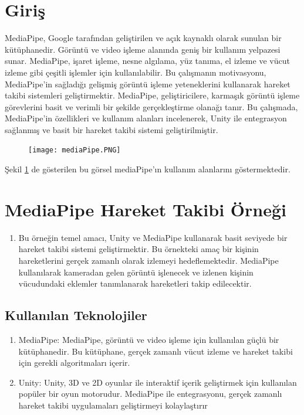 \documentclass[12pt, a4paper]{article}
\begin{document}
	\section{Giriş}
	MediaPipe, Google tarafından geliştirilen ve açık kaynaklı olarak sunulan bir kütüphanedir. Görüntü ve video işleme alanında geniş bir kullanım yelpazesi sunar. MediaPipe, işaret işleme, nesne algılama, yüz tanıma, el izleme ve vücut izleme gibi çeşitli işlemler için kullanılabilir. Bu çalışmanın motivasyonu, MediaPipe'in sağladığı gelişmiş görüntü işleme yeteneklerini kullanarak hareket takibi sistemleri geliştirmektir. MediaPipe, geliştiricilere, karmaşık görüntü işleme görevlerini basit ve verimli bir şekilde gerçekleştirme olanağı tanır. Bu çalışmada, MediaPipe'in özellikleri ve kullanım alanları incelenerek, Unity ile entegrasyon sağlanmış ve basit bir hareket takibi sistemi geliştirilmiştir.
	
	\begin{figure}[!ht]
		\caption{}
		\centering
		\texttt{[image: mediaPipe.PNG]}
		
		\label{mediaPipe}
	\end{figure}
	Şekil \ref{mediaPipe} de gösterilen bu görsel mediaPipe'ın kullanım alanlarını göstermektedir\cite{MediaPipe}.
	\newpage
	\section{MediaPipe Hareket Takibi Örneği}
	\begin{enumerate}
		\item Bu örneğin temel amacı, Unity ve MediaPipe kullanarak basit seviyede bir hareket takibi sistemi geliştirmektir. Bu örnekteki amaç bir kişinin hareketlerini gerçek zamanlı olarak izlemeyi hedeflemektedir. MediaPipe kullanılarak kameradan gelen görüntü işlenecek ve izlenen kişinin vücudundaki eklemler tanımlanarak hareketleri takip edilecektir.
		
	\end{enumerate}
	
	\subsection{Kullanılan Teknolojiler}
		\begin{enumerate}
      \item 	MediaPipe: MediaPipe, görüntü ve video işleme için kullanılan güçlü bir kütüphanedir. Bu kütüphane, gerçek zamanlı vücut izleme ve hareket takibi için gerekli algoritmaları içerir.
	\item Unity: Unity, 3D ve 2D oyunlar ile interaktif içerik geliştirmek için kullanılan popüler bir oyun motorudur. MediaPipe ile entegrasyonu, gerçek zamanlı hareket takibi uygulamaları geliştirmeyi kolaylaştırır
	\end{enumerate}
\end{document}
